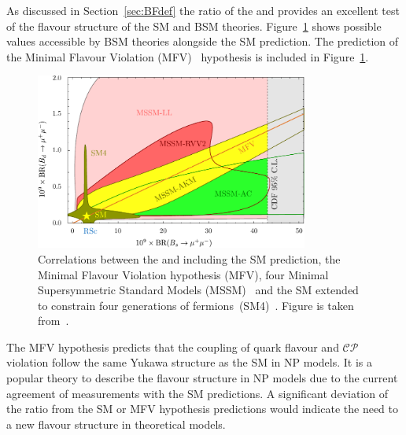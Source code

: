 As discussed in Section~\ref{sec:BFdef} the ratio of the \bdmumu and \bsmumu \Bfs provides an excellent test of the flavour structure of the SM and BSM theories. %
Figure~\ref{fig:ratio} shows possible values accessible by BSM theories alongside the SM prediction. The prediction of the Minimal Flavour Violation (MFV)~\cite{DAmbrosio:2002vsn} hypothesis is included in Figure~\ref{fig:ratio}. 
\begin{figure}[htbp]
    \centering
        \includegraphics[width=0.8\textwidth]{./Figs/Theory/MFV.pdf}
    \caption{Correlations between the \bdmumu and \bsmumu \BFs including the SM prediction, the Minimal Flavour Violation hypothesis (MFV), four Minimal Supersymmetric Standard Models (MSSM)~\cite{Martin:1997ns} and the SM extended to constrain four generations of fermions~(SM4)~\cite{Hou:2008xd}. Figure is taken from~\cite{Straub:2010ih}.}
    \label{fig:ratio}
\end{figure}
The MFV hypothesis predicts that the coupling of quark flavour and $\mathcal{CP}$ violation follow the same Yukawa structure as the SM in NP models. It is a popular theory to describe the flavour structure in NP models due to the current agreement of measurements with the SM predictions. A significant deviation of the \BF ratio from the SM or MFV hypothesis predictions would indicate the need to a new flavour structure in theoretical models.

